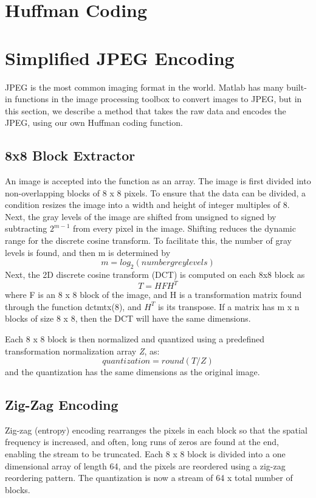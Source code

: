 \documentclass[11pt,a4paper,table]{article}
\begin{document}
\section{Huffman Coding}

\section{Simplified JPEG Encoding}
JPEG is the most common imaging format in the world. Matlab has many built-in functions in the image processing toolbox to convert images to JPEG, but in this section, we describe a method that takes the raw data and encodes the JPEG, using our own Huffman coding function.
\subsection{8x8 Block Extractor}
An image is accepted into the function as an array. The image is first divided into non-overlapping blocks of 8 x 8 pixels. To ensure that the data can be divided, a condition resizes the image into a width and height of integer multiples of 8. Next, the gray levels of the image are shifted from unsigned to signed by subtracting \(2^{m-1}\) from every pixel in the image. Shifting reduces the dynamic range for the discrete cosine transform. To facilitate this, the number of gray levels is found, and then m is determined by 
\begin{equation}
m = log_2(number grey levels)
\end{equation}
Next, the 2D discrete cosine transform (DCT) is computed on each 8x8 block as
\begin{equation}
T = HFH^T
\end{equation}
where F is an 8 x 8 block of the image, and H is a transformation matrix found through the function dctmtx(8), and \(H^T\) is its transpose. If a matrix has m x n blocks of size 8 x 8, then the DCT will have the same dimensions.

Each 8 x 8 block is then normalized and quantized using a predefined transformation normalization array \textit{Z}, as:
\begin{equation}
quantization= round(T/Z)
\end{equation}
and the quantization has the same dimensions as the original image. 

\subsection{Zig-Zag Encoding}
Zig-zag (entropy) encoding rearranges the pixels in each block so that the spatial frequency is increased, and often, long runs of zeros are found at the end, enabling the stream to be truncated. Each 8 x 8 block is divided into a one dimensional array of length 64, and the pixels are reordered using a zig-zag reordering pattern. The quantization is now a stream of 64 x total number of blocks.
\end{document}
